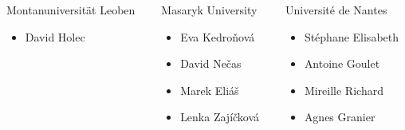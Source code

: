 \documentclass[noamsthm,8pt,t]{beamer}
\begin{document}
\begin{frame}
{      \begin{columns}
         \begin{column}{0.3\textwidth}
            Montanuniversität Leoben
            \begin{itemize}
               \item David Holec
            \end{itemize}
         \end{column}
         \begin{column}{0.3\textwidth}
            Masaryk University
            \begin{itemize}
               \item Eva Kedroňová
               \item David Nečas
               \item Marek Eliáš
               \item Lenka Zajíčková
            \end{itemize}
         \end{column}
         \begin{column}{0.3\textwidth}
            Université de Nantes
            \begin{itemize}
               \item Stéphane Elisabeth
               \item Antoine Goulet
               \item Mireille Richard
               \item Agnes Granier
            \end{itemize}
         \end{column}
      \end{columns} 
   }
   \vspace{0.5cm}

\end{frame}
\end{document}
